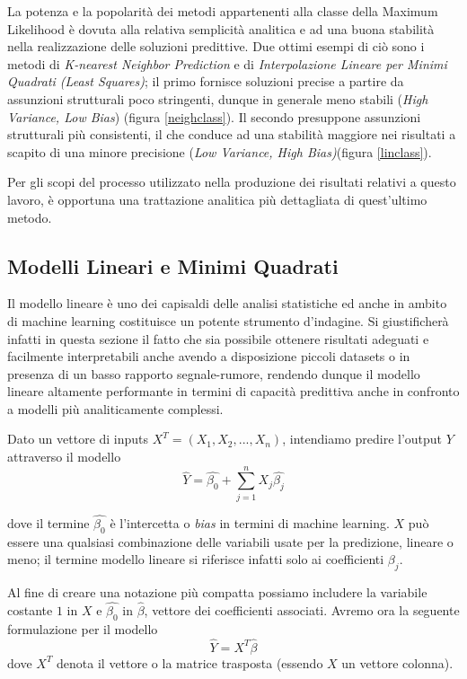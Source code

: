 \documentclass[12pt,openright,twoside,a4paper]{book}
\begin{document}
La potenza e la popolarità dei metodi appartenenti alla classe della Maximum Likelihood è dovuta alla relativa semplicità analitica e ad una buona stabilità nella realizzazione delle soluzioni predittive.
Due ottimi esempi di ciò sono i metodi di \textit{K-nearest Neighbor Prediction} e di \textit{Interpolazione Lineare per Minimi Quadrati (Least Squares)}; il primo fornisce soluzioni precise a partire da assunzioni strutturali poco stringenti, dunque in generale meno stabili (\textit{High Variance, Low Bias}) (figura \ref{neighclass}).
Il secondo presuppone assunzioni strutturali più consistenti, il che conduce ad una stabilità maggiore nei risultati a scapito di una minore precisione (\textit{Low Variance, High Bias)}(figura \ref{linclass}).

Per gli scopi del processo utilizzato nella produzione dei risultati relativi a questo lavoro, è opportuna una trattazione analitica più dettagliata di quest'ultimo metodo.

\subsection{Modelli Lineari e Minimi Quadrati}
Il modello lineare è uno dei capisaldi delle analisi statistiche ed anche in ambito di machine learning costituisce un potente strumento d'indagine.
Si giustificherà infatti in questa sezione il fatto che sia possibile ottenere risultati adeguati e facilmente interpretabili anche avendo a disposizione piccoli datasets o in presenza di un basso rapporto segnale-rumore, rendendo dunque il modello lineare altamente performante in termini di capacità predittiva anche in confronto a modelli più analiticamente complessi.

Dato un vettore di inputs  $X^T = (X_1,X_2,...,X_n)$, intendiamo predire l'output $Y$ attraverso il modello
\begin{equation}
\hat{Y}=\hat{\beta_0}+\sum_{j=1}^{n}X_j\hat{\beta_j}
\end{equation}

dove il termine $\hat{\beta_0}$ è l'intercetta o \textit{bias} in termini di machine learning.
$X$ può essere una qualsiasi combinazione delle variabili usate per la predizione, lineare o meno; il termine
modello lineare si riferisce infatti solo ai coefficienti $\beta_j$.

Al fine di creare una notazione più compatta possiamo includere la variabile costante $1$ in $X$ e $\hat{\beta_0}$ in $\hat{\beta}$, vettore dei coefficienti associati. Avremo ora la seguente formulazione per il modello
\begin{equation}
\hat{Y}=X^T\hat{\beta}
\end{equation}
dove $X^T$ denota il vettore o la matrice trasposta (essendo $X$ un vettore colonna).
\end{document}
